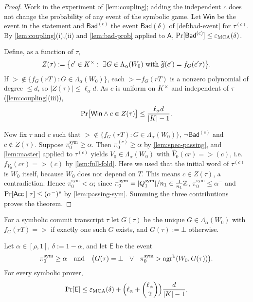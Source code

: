 \begin{proof}
Work in the experiment of \cref{lem:coupling}; adding the independent $c$ does not change
the probability of any event of the symbolic game. Let $\mathsf{Win}$ be the event in
the statement and $\mathsf{Bad}^{(c)}$ the event $\mathsf{Bad}(\delta)$ of
\cref{def:bad-event} for $\tau^{(c)}$. By \cref{lem:coupling}(i),(ii) and
\cref{lem:bad-prob} applied to $\mathsf A$,
$\Pr[\mathsf{Bad}^{(c)}]\le\varepsilon_{\mathrm{MCA}}(\delta)$.

Define, as a function of $\tau$,
\[
Z(\tau):=\bigl\{c'\in K^\times:\ \exists G\in\Lambda_\alpha(W_0)\ \text{with}\ \widetilde g(c')=f_G(c'r)\bigr\}.
\]
If $\gt\notin\{f_G(rT):G\in\Lambda_\alpha(W_0)\}$, each $\gt-f_G(rT)$ is a nonzero
polynomial of degree $\le d$, so $|Z(\tau)|\le\ell_\alpha d$. As $c$ is uniform on
$K^\times$ and independent of $\tau$ (\cref{lem:coupling}(iii)),
\[
\Pr\bigl[\mathsf{Win}\wedge c\in Z(\tau)\bigr]\le\frac{\ell_\alpha d}{|K|-1}.
\]

Now fix $\tau$ and $c$ such that
$\gt\notin\{f_G(rT):G\in\Lambda_\alpha(W_0)\}$, $\neg\mathsf{Bad}^{(c)}$ and
$c\notin Z(\tau)$. Suppose $\pi^{\mathrm{sym}}_0\ge\alpha$. Then
$\pi^{(c)}_0\ge\alpha$ by \cref{lem:spec-passing}, and \cref{lem:master} applied to
$\tau^{(c)}$ yields $V_0\in\Lambda_\alpha(W_0)$ with
$\widehat V_0(cr)=\gt(c)$, i.e.\ $f_{V_0}(cr)=\gt(c)$ by \cref{lem:full-fold}. Here we
used that the initial word of $\tau^{(c)}$ is $W_0$ itself, because $W_0$ does not depend
on $T$. This means $c\in Z(\tau)$, a contradiction. Hence
$\pi^{\mathrm{sym}}_0<\alpha$; since $\pi^{\mathrm{sym}}_0=|Q^{\mathrm{sym}}_1|/n_1\in\frac1{n_1}\mathbb{Z}$,
$\pi^{\mathrm{sym}}_0\le\alpha^-$ and $\Pr[\mathsf{Acc}\mid\tau]\le(\alpha^-)^s$ by
\cref{lem:passing-sym}. Summing the three contributions proves the theorem.
\end{proof}

\begin{definition}\label{def:opened}
For a symbolic commit transcript $\tau$ let $G(\tau)$ be the unique
$G\in\Lambda_\alpha(W_0)$ with $f_G(rT)=\gt$ if exactly one such $G$ exists, and
$G(\tau):=\bot$ otherwise.
\end{definition}

\begin{theorem}\label{thm:identification}
Let $\alpha\in[\rho,1]$, $\delta:=1-\alpha$, and let $\mathsf E$ be the event
\[
\pi^{\mathrm{sym}}_0\ge\alpha\quad\text{and}\quad
\bigl(G(\tau)=\bot\ \ \vee\ \ \pi^{\mathrm{sym}}_0>\agr(W_0,G(\tau))\bigr).
\]
For every symbolic prover,
\[
\Pr[\mathsf E]\le\varepsilon_{\mathrm{MCA}}(\delta)+\Bigl(\ell_\alpha+\binom{\ell_\alpha}2\Bigr)\frac{d}{|K|-1}.
\]
\end{theorem}


